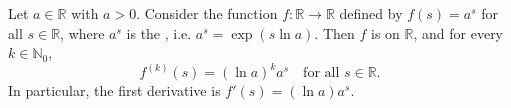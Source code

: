 \begin{proposition}
\label{proposition:derivative_of_real_exponential_function_with_constant_base}
Let $a \in \mathbb{R}$ with $a > 0$. Consider the function
$f : \mathbb{R} \to \mathbb{R}$ defined by $f(s) = a^s$ for all $s \in \mathbb{R}$,
where $a^s$ is the , i.e. $a^s = \exp(s \ln a)$.
Then $f$ is  on $\mathbb{R}$, and for every $k \in \mathbb{N}_0$,
$$f^{(k)}(s) = (\ln a)^k a^s \quad \text{for all } s \in \mathbb{R}.$$
In particular, the first derivative is $f'(s) = (\ln a) a^s$.
\end{proposition}
